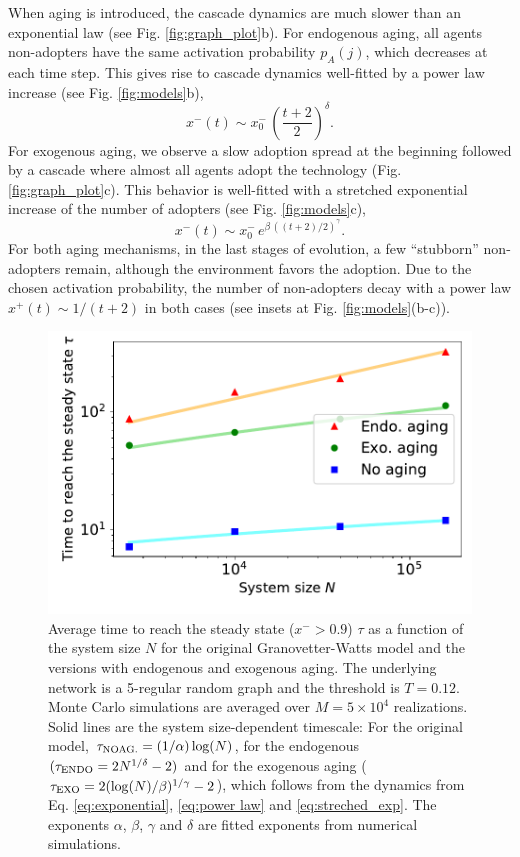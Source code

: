 When aging is introduced, the cascade dynamics are much slower than an exponential law (see Fig. \ref{fig:graph_plot}b). For endogenous aging, all agents non-adopters have the same activation probability $p_A(j)$, which decreases at each time step. This gives rise to cascade dynamics well-fitted by a power law increase (see Fig. \ref{fig:models}b),
\begin{equation}
x^{-}(t) \sim x^{-}_0 \, \left( \frac{t + 2}{2}\right)^\delta .
\label{eq:power law}
\end{equation}
For exogenous aging, we observe a slow adoption spread at the beginning followed by a cascade where almost all agents adopt the technology (Fig. \ref{fig:graph_plot}c). This behavior is well-fitted with a stretched exponential increase of the number of adopters (see Fig. \ref{fig:models}c),
\begin{equation}
x^{-}(t) \sim  x^{-}_0\,  e^{\beta \, ((t + 2) / 2)^{\gamma}} .
\label{eq:streched_exp}
\end{equation}
For both aging mechanisms, in the last stages of evolution, a few ``stubborn'' non-adopters remain, although the environment favors the adoption. Due to the chosen activation probability, the number of non-adopters decay with a power law $x^{+}(t) \sim 1/(t+2)$ in both cases (see insets at Fig. \ref{fig:models}(b-c)).

\begin{figure}
\centering \captionsetup{font=sf}
\includegraphics[width=0.6\columnwidth]{Figs/Aging_Threshold/time_steady.pdf}
\caption[Average time to reach the steady state $\tau$]{\label{fig:time_steady} Average time to reach the steady state ($x^{-} > 0.9$) $\tau$ as a function of the system size $N$ for the original Granovetter-Watts model and the versions with endogenous and exogenous aging. The underlying network is a 5-regular random graph and the threshold is $T = 0.12$. Monte Carlo simulations are averaged over $M = 5 \times 10^4$ realizations. Solid lines are the system size-dependent timescale: For the original model, $\tau_{\rm{NO AG.}} = (1/\alpha)\log(N)$, for the endogenous $(\tau_{\rm{ENDO}} = 2N^{1/\delta} - 2)$ and for the exogenous aging ($\tau_{\rm{EXO}} = 2(\log(N)/\beta)^{1/\gamma} - 2$), which follows from the dynamics from Eq. \eqref{eq:exponential}, \eqref{eq:power law} and \eqref{eq:streched_exp}. The exponents $\alpha$, $\beta$, $\gamma$ and $\delta$ are fitted exponents from numerical simulations.}
\end{figure}


